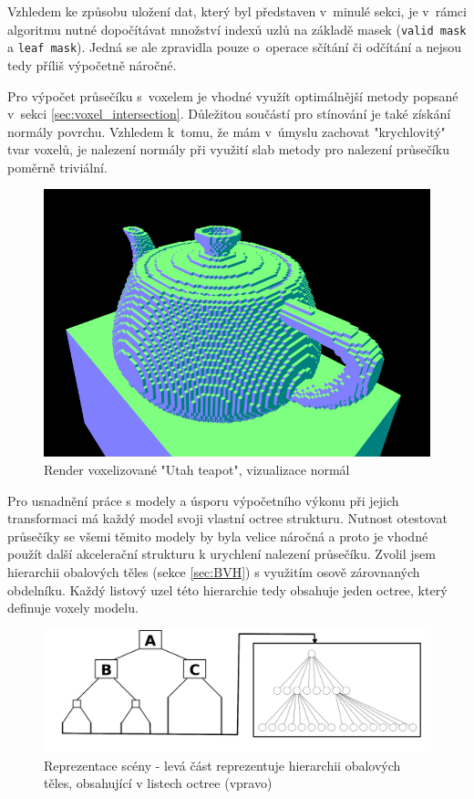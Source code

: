 Vzhledem ke způsobu uložení dat, který byl představen v~minulé sekci, je v~rámci algoritmu nutné dopočítávat množství indexů uzlů na základě masek (\texttt{valid mask} a \texttt{leaf mask}). Jedná se ale zpravidla pouze o~operace sčítání či odčítání a nejsou tedy příliš výpočetně náročné.

Pro výpočet průsečíku s~voxelem je vhodné využít optimálnější metody popsané v~sekci \ref{sec:voxel_intersection}. Důležitou součástí pro stínování je také získání normály povrchu. Vzhledem k~tomu, že mám v~úmyslu zachovat "krychlovitý" tvar voxelů, je nalezení normály při využití slab metody pro nalezení průsečíku poměrně triviální.

\begin{figure}[H]
	\centering
	\includegraphics[scale=1]{obrazky-figures/normals_teapot.png}
	\caption{Render voxelizované "Utah teapot", vizualizace normál }
	\label{fig:octree_child}
\end{figure}

Pro usnadnění práce s modely a úsporu výpočetního výkonu při jejich transformaci má každý model svoji vlastní octree strukturu. Nutnost otestovat průsečíky se všemi těmito modely by byla velice náročná a proto je vhodné použít další akcelerační strukturu k urychlení nalezení průsečíku. Zvolil jsem hierarchii obalových těles (sekce \ref{sec:BVH}) s využitím osově zárovnaných obdelníku. Každý listový uzel této hierarchie tedy obsahuje jeden octree, který definuje voxely modelu. 

\begin{figure}[H]
	\centering
	\includegraphics[scale=1]{images/bvh_octree.png}
	\caption{Reprezentace scény - levá část reprezentuje hierarchii obalových těles, obsahující v listech octree (vpravo)}
	\label{fig:scene_bvh_repr}
\end{figure}

